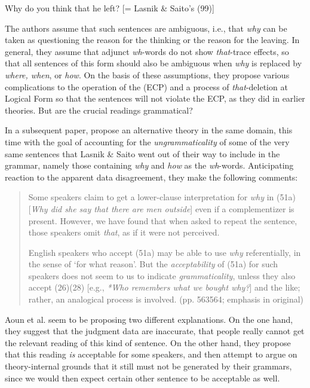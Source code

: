 \ea\label{ex:2:5}
Why do you think that he left?  [= Lasnik \& Saito's (99)]
\z

\noindent
The authors assume that such sentences are ambiguous, i.e., that \textit{why} can be taken as questioning the reason for the thinking or the reason for the leaving. In general, they assume that adjunct \textit{wh}-words do not show \textit{that}-trace effects, so that all sentences of this form should also be ambiguous when \textit{why} is replaced by \textit{where, when}, or \textit{how}. On the basis of these assumptions, they propose various complications to the operation of the  (ECP) and a process of \textit{that}-deletion at Logical Form so that the sentences will not violate the ECP, as they did in earlier theories. But are the crucial readings grammatical?

In a subsequent paper, \citet{AounEtAl1987} propose an alternative theory in the same domain, this time with the goal of accounting for the \textit{ungrammaticality} of some of the very same sentences that Lasnik \& Saito went out of their way to include in the grammar, namely those containing \textit{why} and \textit{how} as the \textit{wh}-words. Anticipating reaction to the apparent data disagreement, they make the following comments:

\begin{quote}
Some speakers claim to get a lower-clause interpretation for \textit{why} in (51a) [\textit{Why did she say that there are men outside}] even if a complementizer is present. However, we have found that when asked to repeat the sentence, those speakers omit \textit{that}, as if it were not perceived.


English speakers who accept (51a) may be able to use \textit{why} referentially, in the sense of `for what reason'. But the \textit{acceptability} of (51a) for such speakers does not seem to us to indicate \textit{grammaticality}, unless they also accept (26)\textendash{}(28) [e.g., \textit{*Who remembers what we bought why?}] and the like; rather, an analogical process is involved. (pp. 563\textendash{}564; emphasis in original)
\end{quote}

\noindent
Aoun et al. seem to be proposing  two different explanations. On the one hand, they suggest that the judgment data are inaccurate, that people really cannot get the relevant reading of this kind of sentence. On the other hand, they propose that this reading \textit{is} acceptable for some speakers, and then attempt to argue on theory-internal grounds that it still must not be generated by their grammars, since we would then expect certain other sentence to be acceptable as well.

